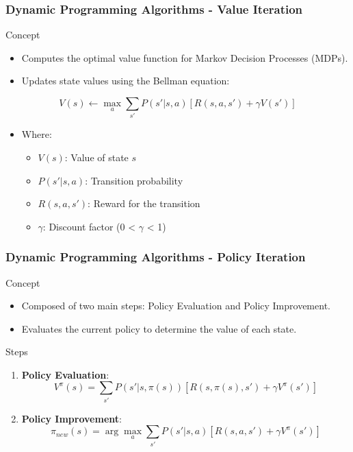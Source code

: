 \documentclass[aspectratio=169]{beamer}
\begin{document}
\begin{frame}[fragile]
  \frametitle{Dynamic Programming Algorithms - Value Iteration}
  \begin{block}{Concept}
    \begin{itemize}
      \item Computes the optimal value function for Markov Decision Processes (MDPs).
      \item Updates state values using the Bellman equation:
      \end{itemize}
      \begin{equation}
        V(s) \leftarrow \max_a \sum_{s'} P(s'|s,a) [R(s,a,s') + \gamma V(s')]
      \end{equation}
      \begin{itemize}
        \item Where:
        \begin{itemize}
          \item \( V(s) \): Value of state \( s \)
          \item \( P(s'|s,a) \): Transition probability
          \item \( R(s,a,s') \): Reward for the transition
          \item \( \gamma \): Discount factor (0 < $\gamma$ < 1)
        \end{itemize}
    \end{itemize}
  \end{block}
\end{frame}

\begin{frame}[fragile]
  \frametitle{Dynamic Programming Algorithms - Policy Iteration}
  \begin{block}{Concept}
    \begin{itemize}
      \item Composed of two main steps: Policy Evaluation and Policy Improvement.
      \item Evaluates the current policy to determine the value of each state.
    \end{itemize}
  \end{block}
  
  \begin{block}{Steps}
    \begin{enumerate}
      \item \textbf{Policy Evaluation}:
        \begin{equation}
          V^\pi(s) = \sum_{s'} P(s'|s,\pi(s)) [R(s,\pi(s),s') + \gamma V^\pi(s')]
        \end{equation}
      \item \textbf{Policy Improvement}:
        \begin{equation}
          \pi_{new}(s) = \arg\max_a \sum_{s'} P(s'|s,a) [R(s,a,s') + \gamma V^\pi(s')]
        \end{equation}
    \end{enumerate}
  \end{block}
\end{frame}
\end{document}
